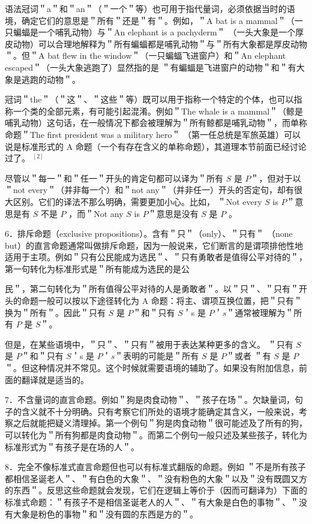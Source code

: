 语法冠词＂a＂和＂an＂（＂一个＂等）也可用于指代量词，必须依据当时的语境，确定它们的意思是＂所有＂还是＂有＂。例如，＂A bat is a mammal＂（一只蝙蝠是一个哺乳动物）与＂An elephant is a pachyderm＂ （一头大象是一个厚皮动物）可以合理地解释为＂所有蝙蝠都是哺乳动物＂与＂所有大象都是厚皮动物＂。但＂A bat flew in the window＂（一只蝙蝠飞进窗户）和＂An elephant escaped＂（一头大象逃跑了）显然指的是 ＂有蝙蝠是飞进窗户的动物＂和＂有大象是逃跑的动物＂。

冠词＂the＂（＂这＂、＂这些＂等）既可以用于指称一个特定的个体，也可以指称一个类的全部元素，有可能引起混淆。例如＂The whale is a mammal＂（鲸是哺乳动物）这句话，在一般情况下都会被理解为＂所有鲸都是哺乳动物＂，而单称命题＂The first president was a military hero＂ （第一任总统是军旅英雄）可以说是标准形式的 A 命题（一个有存在含义的单称命题），其道理本节前面已经讨论过了。 ${ }^{[2]}$

尽管以＂每一＂和＂任一＂开头的肯定句都可以译为＂所有 $S$ 是 $P$＂，但对于以＂not every＂（并非每一个）和＂not any＂（并非任一）开头的否定句，却有很大区别。它们的译法不那么明确，需要更加小心。比如， ＂Not every $S$ is $P$＂意思是有 $S$ 不是 $P$ ，而＂Not any $S$ is $P$＂意思是没有 $S$ 是 $P$ 。

6．排斥命题（exclusive propositions）。含有＂只＂（only）、＂只有＂ （none but）的直言命题通常叫做排斥命题，因为一般说来，它们断言的是谓项排他性地适用于主项。例如＂只有公民能成为选民＂、＂只有勇敢者是值得公平对待的＂，第一句转化为标准形式是＂所有能成为选民的是公

民＂，第二句转化为＂所有值得公平对待的人是勇敢者＂。以＂只＂、＂只有＂开头的命题一般可以按以下途径转化为 A 命题：将主、谓项互换位置，把＂只有＂换为＂所有＂。因此＂只有 $S$ 是 $P$＂和＂只有 $S$＇s 是 $P$＇$s$＂通常被理解为＂所有 $P$ 是 $S$＂。

但是，在某些语境中，＂只＂、＂只有＂被用于表达某种更多的含义。 ＂只有 $S$ 是 $P$＂和＂只有 $S$＇s 是 $P$＇$s$＂表明的可能是＂所有 $S$ 是 $P$＂或者 ＂有 $S$ 是 $P$＂。但这种情况并不常见。这个时候就需要语境的辅助了。如果没有附加信息，前面的翻译就是适当的。

7．不含量词的直言命题。例如＂狗是肉食动物＂、＂孩子在场＂。欠缺量词，句子的含义就不十分明确。只有考察它们所处的语境才能确定其含义，一般来说，考察之后就能把疑义清理掉。第一个例句＂狗是肉食动物＂很可能述及了所有的狗，可以转化为＂所有狗都是肉食动物＂。而第二个例句一般只述及某些孩子，转化为标准形式为＂有孩子是在场的人＂。

8．完全不像标准式直言命题但也可以有标准式翻版的命题。例如 ＂不是所有孩子都相信圣诞老人＂、＂有白色的大象＂、＂没有粉色的大象＂以及＂没有既圆又方的东西＂。反思这些命题就会发现，它们在逻辑上等价于（因而可翻译为）下面的标准式命题：＂有孩子不是相信圣诞老人的人＂、＂有大象是白色的事物＂、＂没有大象是粉色的事物＂和＂没有圆的东西是方的＂。

